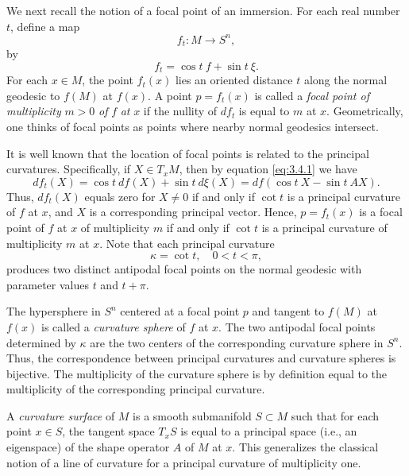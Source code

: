 \documentclass[12pt]{article}
\begin{document}
We next recall the notion of a focal point  of an immersion.  For each
real number $t$, define a map
\begin{displaymath}
f_t:M \rightarrow S^n,
\end{displaymath}
by
\begin{equation}
\label{eq:3.4.2}
f_t = \cos t \ f + \sin t \ \xi.
\end{equation} 
For each $x \in M$, the point $f_t(x)$ lies an oriented distance $t$ along the normal geodesic
to $f(M)$ at $f(x)$.  A point $p = f_t(x)$ is called a 
{\em focal point of multiplicity} $m>0$ 
{\em of} $f$ {\em at} $x$ if the nullity of $df_t$ is equal to $m$ at $x$.  Geometrically, one thinks of focal points
as points where nearby normal geodesics intersect.  

It is well known that the location of focal points is related to the
principal curvatures.  Specifically, if $X \in T_xM$, then by equation \eqref{eq:3.4.1} we have
\begin{equation}
\label{eq:3.4.3}
df_t(X) = \cos t \ df(X) + \sin t \ d\xi(X) = df(\cos t \ X - \sin t \ AX).
\end{equation} 
Thus, $df_t(X)$ equals zero for $X\neq0$ if and only if $\cot t$ is a principal curvature of $f$ at $x$,
and $X$ is a corresponding principal vector.  Hence, $p = f_t(x)$ is a focal point of $f$ at $x$ of
multiplicity $m$ if and only if $\cot t$ is a principal curvature of multiplicity $m$ at $x$.  Note
that each principal curvature 
\begin{displaymath}
\kappa = \cot t, \quad 0<t<\pi,
\end{displaymath}
produces two distinct antipodal focal points
on the normal geodesic with parameter values $t$ and $t+\pi$.  

The hypersphere in $S^n$ centered at a focal point
$p$ and tangent to $f(M)$ at $f(x)$ is called a 
{\em curvature sphere} of $f$ at $x$.  The
two antipodal focal points determined by $\kappa$ are the two centers of the corresponding curvature sphere in $S^n$.
Thus, the correspondence between principal curvatures and curvature spheres is bijective.  The multiplicity
of the curvature sphere is by definition equal to the multiplicity of the corresponding principal curvature.

A {\em curvature surface} of $M$ is a smooth submanifold $S\subset M$
such that for each point $x \in S$, the tangent space
$T_xS$ is equal to a principal space (i.e., an eigenspace) of the shape operator
$A$ of $M$ at $x$. This generalizes the classical notion of a line of curvature 
for a principal curvature of multiplicity one.
\end{document}
